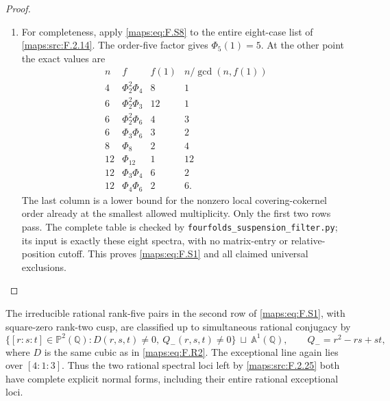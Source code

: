 \begin{proof}
\begin{enumerate}[label=\arabic*.]
\item For completeness, apply \eqref{maps:eq:F.S8} to the entire eight-case
list of \ref{maps:src:F.2.14}.  The order-five factor gives $\Phi_5(1)=5$.
At the other point the exact values are
\[
\begin{array}{c|c|r|r}
 n&f&f(1)&n/\gcd(n,f(1))\\\hline
 4&\Phi_2^2\Phi_4&8&1\\
 6&\Phi_2^2\Phi_3&12&1\\
 6&\Phi_2^2\Phi_6&4&3\\
 6&\Phi_3\Phi_6&3&2\\
 8&\Phi_8&2&4\\
 12&\Phi_{12}&1&12\\
 12&\Phi_3\Phi_4&6&2\\
 12&\Phi_4\Phi_6&2&6.
\end{array}
 \tag{F.S9}\label{maps:eq:F.S9}
\]
The last column is a lower bound for the nonzero local
covering-cokernel order already at the smallest allowed
multiplicity.  Only the first two rows pass.
The complete table is checked by
\texttt{fourfolds\_suspension\_filter.py}; its input is
exactly these eight spectra, with no matrix-entry or
relative-position cutoff.  This proves \eqref{maps:eq:F.S1} and all
claimed universal exclusions.

\end{enumerate}
\end{proof}




\begin{theorem}\label{maps:src:F.2.26}


The irreducible rational rank-five pairs in the second row
of \eqref{maps:eq:F.S1}, with square-zero rank-two cusp, are classified
up to simultaneous rational conjugacy by
\[
 \{[r:s:t]\in\mathbb P^2(\mathbb Q):
             D(r,s,t)\ne0,\ Q_-(r,s,t)\ne0\}
       \ \sqcup\ \mathbb A^1(\mathbb Q),
 \qquad Q_-=r^2-rs+st,
 \tag{F.R10}\label{maps:eq:F.R10}
\]
where $D$ is the same cubic as in \eqref{maps:eq:F.R2}.
The exceptional line again lies over $[4:1:3]$.
Thus the two rational spectral loci left by \ref{maps:src:F.2.25} both
have complete explicit normal forms, including their
entire rational exceptional loci.

\end{theorem}


